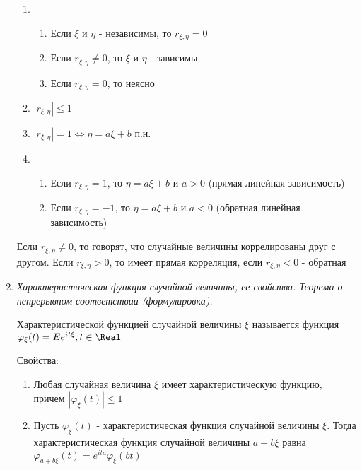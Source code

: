 \begin{enumerate}
\begin{enumerate}
        \item \begin{enumerate}
            \item Если $\xi$ и $\eta$ - независимы, то $r_{\xi,\eta} = 0$

            \item Если $r_{\xi,\eta} \neq 0$, то $\xi$ и $\eta$ - зависимы

            \item Если $r_{\xi,\eta} = 0$, то неясно
        \end{enumerate}

        \item $|r_{\xi,\eta}| \leq 1$

        \item $|r_{\xi,\eta}| = 1 \Longleftrightarrow \eta = a \xi + b$ п.н.

        \item \begin{enumerate} 
            \item Если $r_{\xi,\eta} = 1$, то $\eta = a\xi + b$ и $a > 0$ (прямая линейная зависимость)

            \item Если $r_{\xi,\eta} = -1$, то $\eta = a\xi + b$ и $a < 0$ (обратная линейная зависимость)
        \end{enumerate}
    \end{enumerate}

    Если $r_{\xi,\eta} \neq 0$, то говорят, что случайные величины коррелированы друг с другом. Если $r_{\xi,\eta} > 0$, 
    то имеет прямая корреляция, если $r_{\xi,\eta} < 0$ - обратная

    \item \textit{Характеристическая функция случайной величины, ее свойства. Теорема о непрерывном соответствии (формулировка).}

    \hyperlink{characteristicfunction}{Характеристической функцией} случайной величины $\xi$ называется функция $\varphi_\xi(t) = Ee^{it\xi}, t \in \Real$
    
    Свойства:

    \begin{enumerate}
        \item Любая случайная величина $\xi$ имеет характеристическую функцию, причем $|\varphi_\xi(t)| \leq 1$

        \item Пусть $\varphi_\xi(t)$ - характеристическая функция случайной величины $\xi$. Тогда характеристическая функция
        случайной величины $a + b\xi$ равна $\varphi_{a + b\xi}(t) = e^{ita} \varphi_{\xi}(bt)$


\end{enumerate}
\end{enumerate}
